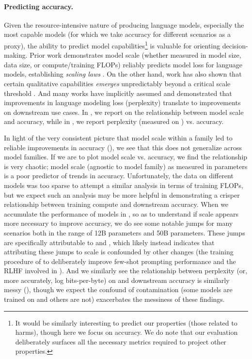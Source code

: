\paragraph{Predicting accuracy.}
Given the resource-intensive nature of producing language models, especially the most capable models (for which we take accuracy for different scenarios as a proxy), the ability to predict model capabilities\footnote{It would be similarly interesting to predict our properties (\eg those related to harms), though here we focus on accuracy. We do note that our evaluation deliberately surfaces all the necessary metrics required to project other properties.} is valuable for orienting decision-making.
Prior work demonstrates model scale (whether measured in model size, data size, or compute/training FLOPs) reliably predicts model loss for language models, establishing \textit{scaling laws} \citep{kaplan2020scaling, hoffmann2022chinchilla}.
On the other hand, work has also shown that certain qualitative capabilities \citep[\eg in-context learning;][]{brown2020gpt3} \textit{emerges} unpredictably beyond a critical scale threshold \citep[see][]{wei2022emergent}.
And many works have implicitly assumed and demonstrated that improvements in language modeling loss (\ie perplexity) translate to improvements on downstream use cases. 
In , we report on the relationship between model scale and accuracy, while in , we report perplexity (measured on \pile) vs. accuracy.

In light of the very consistent picture that model scale within a family led to reliable improvements in accuracy (), we see that this does not generalize across model families.
If we are to plot model scale vs. accuracy, we find the relationship is very chaotic; model scale (agnostic to model family) as measured in parameters is a poor predictor of trends in accuracy.
Unfortunately, the data on different models was too sparse to attempt a similar analysis in terms of training FLOPs, but we expect such an analysis may be more helpful in demonstrating a crisper relationship between training compute and downstream accuracy.
When we accumulate the performance of models in , so as to understand if scale appears more necessary to improve accuracy, we do see some notable jumps for many scenarios both in the range of 12B parameters and 50B parameters.
These jumps are specifically attributable to \tzero and \anthropic, which likely instead indicates that attributing these jumps to scale is confounded by other changes (\ie the training procedure of \tzero to deliberately improve few-shot prompting performance and the RLHF involved in \anthropic).
And we similarly see the relationship between perplexity (or, more accurately, log bits-per-byte) on \pile and downstream accuracy is similarly messy (), though we expect the confound of contamination (some models are trained on \pile and others are not) exacerbates the messiness of these findings.